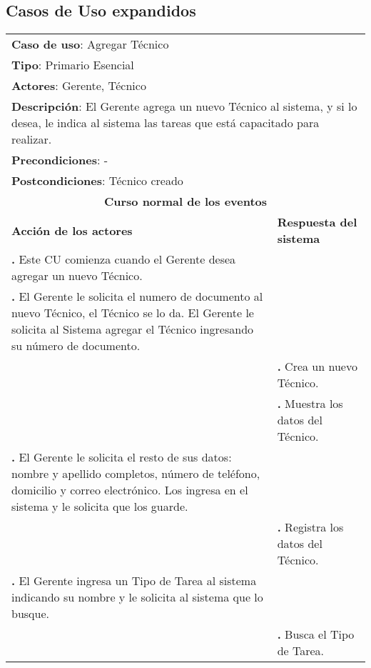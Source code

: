 \documentclass[12pt]{extarticle}
\begin{document}
    \subsection{Casos de Uso expandidos}

    \newcommand\inc{\stepcounter{step}\textbf{\thestep. }}
    \newcommand\resetinc{\setcounter{step}{0}}
    
    \newcommand\raya{\noindent\rule{169mm}{0.8mm}\\}

\begin{longtable}{ |p{8cm}|p{8cm}| }
    \hline
    \multicolumn{2}{|p{16cm}|}{\textbf{Caso de uso}: Agregar Técnico}\\
    \multicolumn{2}{|p{16cm}|}{\textbf{Tipo}: Primario Esencial}\\
    \multicolumn{2}{|p{16cm}|}{\textbf{Actores}: Gerente, Técnico}\\
    \multicolumn{2}{|p{16cm}|}{\textbf{Descripción}: El Gerente agrega un nuevo Técnico al sistema, y si lo desea, le indica al sistema las tareas que está capacitado para realizar.}\\
    \multicolumn{2}{|p{16cm}|}{\textbf{Precondiciones}: - }\\
    \multicolumn{2}{|p{16cm}|}{\textbf{Postcondiciones}: Técnico creado}\\
    \hline
    \multicolumn{2}{|c|}{\textbf{Curso normal de los eventos}}\\
    \hline
    \textbf{Acción de los actores} & \textbf{Respuesta del sistema}\\
    \hline
        \inc Este CU comienza cuando el Gerente desea agregar un nuevo Técnico.& \\
        \hline
        \inc  El Gerente le solicita el numero de documento al nuevo Técnico, el Técnico se lo da. El Gerente le solicita al Sistema agregar el Técnico ingresando su número de documento.& \\
        \hline
        & \inc  Crea un nuevo Técnico.\\
        \hline
        & \inc  Muestra los datos del Técnico.\\
        \hline


        \inc El Gerente le solicita el resto de sus datos: nombre y apellido completos, número de teléfono, domicilio y correo electrónico. Los ingresa en el sistema y le solicita que los guarde.& \\
        \hline
        & \inc Registra los datos del Técnico.\\
        \hline
        \inc El Gerente ingresa un Tipo de Tarea al sistema indicando su nombre y le solicita al sistema que lo busque.& \\
        \hline
        & \inc Busca el Tipo de Tarea. \\
        \hline



\end{longtable}
\end{document}
